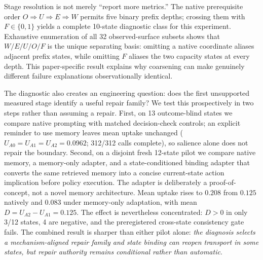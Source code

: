 Stage resolution is not merely ``report more metrics.'' The native prerequisite order $O\Rightarrow U\Rightarrow E\Rightarrow W$ permits five binary prefix depths; crossing them with $F\in\{0,1\}$ yields a complete 10-state diagnostic class for this experiment. Exhaustive enumeration of all 32 observed-surface subsets shows that $W/E/U/O/F$ is the unique separating basis: omitting a native coordinate aliases adjacent prefix states, while omitting $F$ aliases the two capacity states at every depth. This paper-specific result explains why coarsening can make genuinely different failure explanations observationally identical.

The diagnostic also creates an engineering question: does the first unsupported measured stage identify a useful repair family? We test this prospectively in two steps rather than assuming a repair. First, on 13 outcome-blind states we compare native prompting with matched decision-check controls; an explicit reminder to use memory leaves mean uptake unchanged ($U_{A0}=U_{A1}=U_{A2}=0.0962$; 312/312 calls complete), so salience alone does not repair the boundary. Second, on a disjoint fresh 12-state pilot we compare native memory, a memory-only adapter, and a state-conditioned binding adapter that converts the same retrieved memory into a concise current-state action implication before policy execution. The adapter is deliberately a proof-of-concept, not a novel memory architecture. Mean uptake rises to $0.208$ from $0.125$ natively and $0.083$ under memory-only adaptation, with mean $D=U_{A2}-U_{A1}=0.125$. The effect is nevertheless concentrated: $D>0$ in only 3/12 states, 4 are negative, and the preregistered cross-state consistency gate fails. The combined result is sharper than either pilot alone: \emph{the diagnosis selects a mechanism-aligned repair family and state binding can reopen transport in some states, but repair authority remains conditional rather than automatic}.

